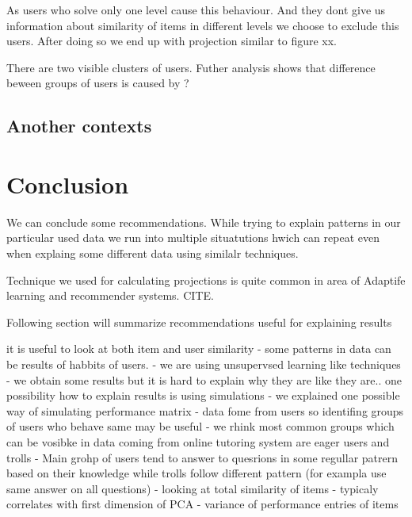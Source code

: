 \documentclass[
  digital, %
  table,   %
  nolof,     %
  nolot,     %
  nocover
]{fithesis3}
\begin{document}
As users who solve only one level cause this behaviour. And they dont
give us information about similarity of items in different levels we
choose to exclude this users. After doing so we end up with projection
similar to figure xx.

There are two visible clusters of users. Futher analysis shows that
difference beween groups of users is caused by ?

\section{Another contexts}\label{another-contexts}



\chapter{Conclusion}


We can conclude some recommendations. While trying to explain patterns
in our particular used data we run into multiple situatutions hwich can
repeat even when explaing some different data using similalr techniques.

Technique we used for calculating projections is quite common in area of
Adaptife learning and recommender systems. CITE.


Following section will summarize recommendations useful for explaining
results

it is useful to look at both item and user similarity - some
patterns in data can be results of habbits of users. - we are using
unsupervsed learning like techniques - we obtain some results but it is
hard to explain why they are like they are.. one possibility how to
explain results is using simulations - we explained one possible way of
simulating performance matrix - data fome from users so identifing
groups of users who behave same may be useful - we rhink most common
groups which can be vosibke in data coming from online tutoring system
are eager users and trolls - Main grohp of users tend to answer to
quesrions in some regullar patrern based on their knowledge while trolls
follow different pattern (for exampla use same answer on all questions)
- looking at total similarity of items - typicaly correlates with first
dimension of PCA - variance of performance entries of items
\end{document}
